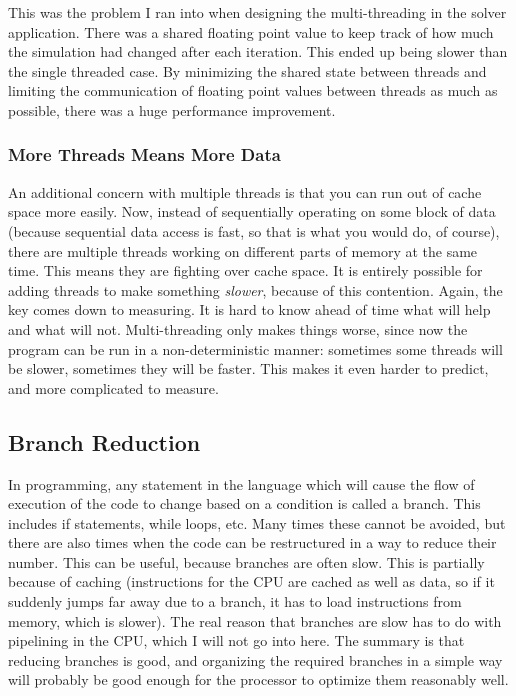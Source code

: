 This was the problem I ran into when designing the multi-threading in the solver application. There was a shared floating point value
to keep track of how much the simulation had changed after each iteration. This ended up being slower than the single threaded case.
By minimizing the shared state between threads and limiting the communication of floating point values between threads as much as
possible, there was a huge performance improvement.

\subsubsection{More Threads Means More Data}

An additional concern with multiple threads is that you can run out of cache space more easily. Now, instead of sequentially operating
on some block of data (because sequential data access is fast, so that is what you would do, of course), there are multiple threads
working on different parts of memory at the same time. This means they are fighting over cache space. It is entirely possible for
adding threads to make something \textit{slower}, because of this contention. Again, the key comes down to measuring. It is hard to
know ahead of time what will help and what will not. Multi-threading only makes things worse, since now the program can be run in a
non-deterministic manner: sometimes some threads will be slower, sometimes they will be faster. This makes it even harder to predict,
and more complicated to measure.

\subsection{Branch Reduction}

In programming, any statement in the language which will cause the flow of execution of the code to change based on a condition
is called a branch. This includes if statements, while loops, etc. Many times these cannot be avoided, but there are also
times when the code can be restructured in a way to reduce their number. This can be useful, because branches are often slow.
This is partially because of caching (instructions for the CPU are cached as well as data, so if it suddenly jumps far away due
to a branch, it has to load instructions from memory, which is slower). The real reason that branches are slow has to do with
pipelining in the CPU, which I will not go into here. The summary is that reducing branches is good, and organizing the required
branches in a simple way will probably be good enough for the processor to optimize them reasonably well.

